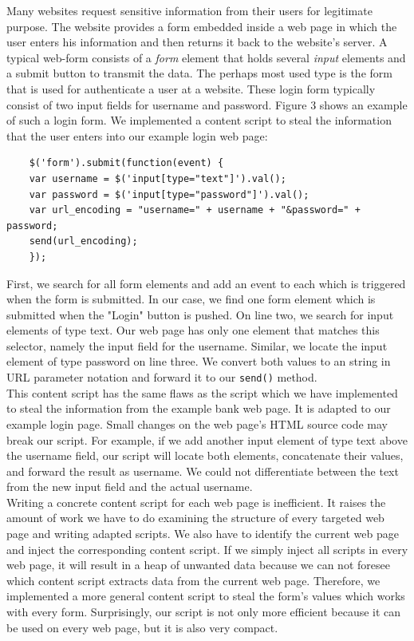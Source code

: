 	Many websites request sensitive information from their users for legitimate purpose. The website provides a form embedded inside a web page in which the user enters his information and then returns it back to the website's server. A typical web-form consists of a \textit{form} element that holds several \textit{input} elements and a submit button to transmit the data. The perhaps most used type is the form that is used for authenticate a user at a website. These login form typically consist of two input fields for username and password. Figure 3 shows an example of such a login form. We implemented a content script to steal the information that the user enters into our example login web page: \\
	
	\begin{lstlisting}
	$('form').submit(function(event) {
	var username = $('input[type="text"]').val();
	var password = $('input[type="password"]').val();
	var url_encoding = "username=" + username + "&password=" + password;
	send(url_encoding);
	});
	\end{lstlisting}
	
	First, we search for all form elements and add an event to each which is triggered when the form is submitted. In our case, we find one form element which is submitted when the "Login" button is pushed. On line two, we search for input elements of type text. Our web page has only one element that matches this selector, namely the input field for the username. Similar, we locate the input element of type password on line three. We convert both values to an string in URL parameter notation and forward it to our \texttt{send()} method. \\
	
	This content script has the same flaws as the script which we have implemented to steal the information from the example bank web page. It is adapted to our example login page. Small changes on the web page's HTML source code may break our script. For example, if we add another input element of type text above the username field, our script will locate both elements, concatenate their values, and forward the result as username. We could not differentiate between the text from the new input field and the actual username. \\
	
	Writing a concrete content script for each web page is inefficient. It raises the amount of work we have to do examining the structure of every targeted web page and writing adapted scripts. We also have to identify the current web page and inject the corresponding content script. If we simply inject all scripts in every web page, it will result in a heap of unwanted data because we can not foresee which content script extracts data from the current web page. Therefore, we implemented a more general content script to steal the form's values which works with every form. Surprisingly, our script is not only more efficient because it can be used on every web page, but it is also very compact. \\
	
